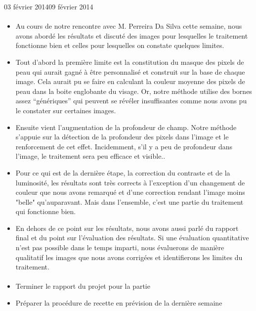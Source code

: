 \documentclass[11pt, french,screen]{report-rd-info}
\begin{document}
\begin{fichesuivi}{03 février 2014}{09 février 2014}
\paragraph{}
	\begin{echange}
		\begin{itemize}
			\item Au cours de notre rencontre avec M. Perreira Da Silva cette semaine, nous avons abordé les résultats et discuté des images pour lesquelles le traitement fonctionne bien et celles pour lesquelles on constate quelques limites.
			\item Tout d’abord la première limite est la constitution du masque des pixels de peau qui aurait gagné à être personnalisé et construit sur la base de chaque image. Cela aurait pu se faire en calculant la couleur moyenne des pixels de peau dans la boite englobante du visage. Or, notre méthode utilise des bornes assez “génériques” qui peuvent se révéler insuffisantes comme nous avons pu le constater sur certaines images.
			\item Ensuite vient l’augmentation de la profondeur de champ. Notre méthode s’appuie sur la détection de la profondeur des pixels dans l’image et le renforcement de cet effet. Incidemment, s’il y a peu de profondeur dans l’image, le traitement sera peu efficace et visible..
	\item Pour ce qui est de la dernière étape, la correction du contraste et de la luminosité, les résultats sont très corrects à l’exception d’un changement de couleur que nous avons remarqué et d’une correction rendant l’image moins "belle" qu’auparavant. Mais dans l’ensemble, c’est une partie du traitement qui fonctionne bien.
	\item En dehors de ce point sur les résultats, nous avons aussi parlé du rapport final et du point sur l’évaluation des résultats. Si une évaluation quantitative n’est pas possible dans le temps imparti, nous évaluerons de manière qualitatif les images que nous avons corrigées et identifierons les limites du traitement.
		\end{itemize}
	\end{echange}

\paragraph*{}
	\begin{planification}
		\begin{itemize}
			\item Terminer le rapport du projet pour la partie 
			\item Préparer la procédure de recette en prévision de la dernière semaine
\end{itemize}
	\end{planification}
\end{fichesuivi}
\end{document}

